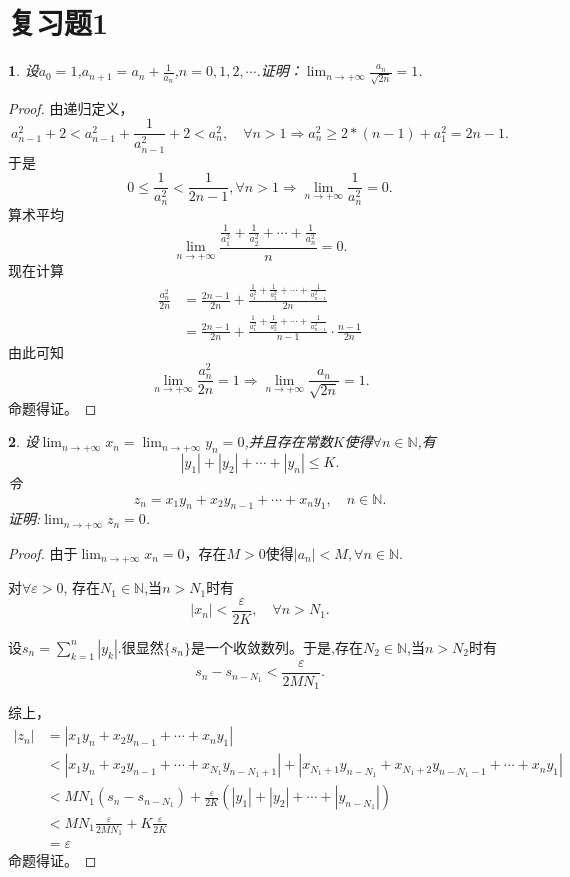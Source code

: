 \documentclass[utf8]{book}
\newtheorem{example}{}[section]             %
\begin{document}
\section{复习题1}
\begin{example}
设$a_0=1$,$a_{n+1}=a_n+\frac{1}{a_n}$,$n=0,1,2,\cdots$.证明：$\displaystyle\lim_{n\to +\infty}\frac{a_n}{\sqrt{2n}}= 1$.
\end{example}
\begin{proof}
由递归定义，
$$a_{n-1}^2+2 < a_{n-1}^2+\frac{1}{a^2_{n-1}} + 2< a_{n}^2,\quad\forall n > 1\Rightarrow a^2_{n}\geq 2*(n-1) + a_1^2=2n-1.$$
于是
$$0\leq \frac{1}{a_n^2} < \frac{1}{2n-1}, \forall n > 1\Rightarrow \displaystyle\lim_{n\to +\infty}\frac{1}{a_n^2}= 0.$$
算术平均
$$\displaystyle\lim_{n\to +\infty}\frac{\displaystyle\frac{1}{a_1^2}+\frac{1}{a_2^2} +\cdots +\frac{1}{a_n^2}}{n} = 0.$$
现在计算
\begin{equation*}
\begin{split}
\frac{a^2_n}{2n} &= \frac{2n-1}{2n} +\frac{\frac{1}{a_1^2}+\frac{1}{a_2^2} +\cdots +\frac{1}{a_{n-1}^2}}{2n}\\
&=\frac{2n-1}{2n} +\frac{\frac{1}{a_1^2}+\frac{1}{a_2^2} +\cdots +\frac{1}{a_{n-1}^2}}{n-1}\cdot\frac{n-1}{2n}
\end{split}
\end{equation*}
由此可知
$$\displaystyle\lim_{n\to +\infty}\frac{a^2_n}{2n}= 1\Rightarrow \displaystyle\lim_{n\to +\infty}\frac{a_n}{\sqrt{2n}}= 1.$$
命题得证。
\end{proof}
\begin{example}
设$\displaystyle\lim_{n\to +\infty}x_n=\lim_{n\to +\infty}y_n=0$,并且存在常数$K$使得$\forall n\in\mathbb{N}$,有$$|y_1|+|y_2|+\cdots+|y_n|\leq K.$$
令$$z_n=x_1y_n+x_2y_{n-1}+\cdots+x_ny_1,\quad n\in\mathbb{N}.$$证明:$\displaystyle\lim_{n\to +\infty}z_n=0$.
\end{example}
\begin{proof}
由于$\displaystyle\lim_{n\to +\infty}x_n=0$，存在$M > 0$使得$|a_n| < M, \forall n\in\mathbb{N}$.

对$\forall \varepsilon > 0$, 存在$N_1\in\mathbb{N}$,当$n>N_1$时有$$\left|x_n\right| < \frac{\varepsilon}{2K}, \quad\forall n > N_1.$$

设$s_n=\displaystyle\sum_{k=1}^{n}\left|y_k\right|$.很显然$\{s_n\}$是一个收敛数列。于是,存在$N_2\in\mathbb{N}$,当$n>N_2$时有
$$s_{n} - s_{n-N_1} <\frac{\varepsilon}{2MN_1}.$$

综上，
\begin{equation*}
\begin{split}
\left|z_n\right|&=\left|x_1y_n+x_2y_{n-1}+\cdots+x_ny_1\right|\\
&<\left|x_1y_n+x_2y_{n-1}+\cdots+x_{N_1}y_{n-N_1+1}\right| + \left|x_{N_1+1}y_{n-N_1}+x_{N_1+2}y_{n-N_1-1}+\cdots+x_{n}y_1\right|\\
&<MN_1(s_n-s_{n-N_1}) + \frac{\varepsilon}{2K}(|y_1|+|y_2|+\cdots +|y_{n-N_1}|)\\
&<MN_1\frac{\varepsilon}{2MN_1}+K\frac{\varepsilon}{2K} \\&= \varepsilon
\end{split}
\end{equation*}
命题得证。
\end{proof}
\end{document}
